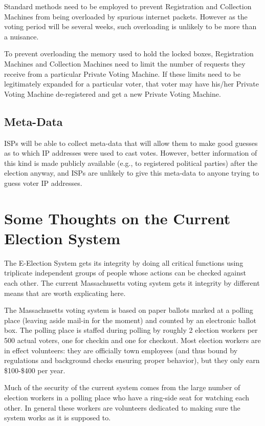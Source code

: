 \documentclass[12pt]{article}
\begin{document}
Standard methods need to be employed to prevent Registration and
Collection Machines from being overloaded by spurious internet packets.
However as the voting period will be several weeks, such
overloading is unlikely to be more than a nuisance.

To prevent overloading the memory used to hold the locked boxes,
Registration Machines and Collection Machines need to limit the
number of requests they receive from a particular Private Voting Machine.
If these limits need to be legitimately expanded for a particular
voter, that voter may have his/her Private Voting Machine de-registered
and get a new Private Voting Machine.

\subsection{Meta-Data}

ISPs will be able to collect meta-data that will allow them to
make good guesses as to which IP addresses were used to cast votes.
However, better information of this kind is made publicly available
(e.g., to registered political parties) after the election anyway,
and ISPs are unlikely to give this meta-data to anyone trying to
guess voter IP addresses.


\section{Some Thoughts on the Current Election System}

The E-Election System gets its integrity by doing all critical
functions using triplicate independent groups of people
whose actions can be checked against each other.  The current
Massachusetts voting system gets it integrity by different
means that are worth explicating here.

The Massachusetts voting system is based on paper
ballots marked at a polling place (leaving aside mail-in for the moment)
and counted by an electronic ballot box.  The polling place
is staffed during polling by roughly 2 election workers per 500
actual voters, one for checkin and one for checkout.  Most
election workers are in effect volunteers: they are officially
town employees (and thus bound by regulations and background checks
ensuring proper behavior), but they only earn \$100-\$400 per year.

Much of the security of the current system comes from the large
number of election workers in a polling place who have
a ring-side seat for watching each other.  In general these workers
are volunteers dedicated to making sure the system
works as it is supposed to.
\end{document}
